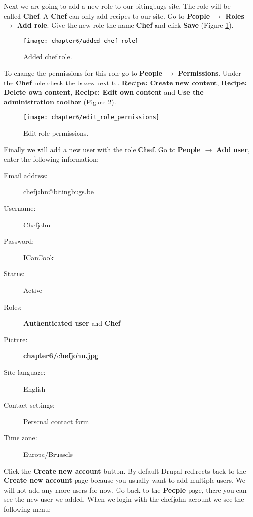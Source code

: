    Next we are going to add a new role to our bitingbugs site. The role will be called \textbf{Chef}. A \textbf{Chef} can only add recipes to our site. Go to \textbf{People $\rightarrow$ Roles $\rightarrow$ Add role}. Give the new role the name \textbf{Chef} and click \textbf{Save} (Figure \ref{fig:added_chef_role}).
   
   \begin{figure}[H]
   	\centering
   	\texttt{[image: chapter6/added\_chef\_role]}
   	\caption{Added chef role.}
   	\label{fig:added_chef_role}
   \end{figure}
   
   To change the permissions for this role go to \textbf{People $\rightarrow$ Permissions}. Under the \textbf{Chef} role check the boxes next to: \textbf{Recipe: Create new content}, \textbf{Recipe: Delete own content}, \textbf{Recipe: Edit own content} and \textbf{Use the administration toolbar} (Figure \ref{fig:edit_role_permissions}).
   
   \begin{figure}[H]
   	\centering
   	\texttt{[image: chapter6/edit\_role\_permissions]}
   	\caption{Edit role permissions.}
   	\label{fig:edit_role_permissions}
   \end{figure}
   
   Finally we will add a new user with the role \textbf{Chef}. Go to \textbf{People $\rightarrow$ Add user}, enter the following information:
   
   \begin{description}
   	\item[Email address:] chefjohn@bitingbugs.be
   	\item[Username:] Chefjohn
   	\item[Password:] ICanCook
   	\item[Status:] Active
   	\item[Roles:] \textbf{Authenticated user} and \textbf{Chef}
   	\item[Picture:] \textbf{chapter6/chefjohn.jpg}
   	\item[Site language:] English
   	\item[Contact settings:] Personal contact form
   	\item[Time zone:] Europe/Brussels
   \end{description}
   
   Click the \textbf{Create new account} button. By default Drupal redirects back to the \textbf{Create new account} page because you usually want to add multiple users. We will not add any more users for now. Go back to the \textbf{People} page, there you can see the new user we added. 
   When we login with the chefjohn account we see the following menu:  
   
